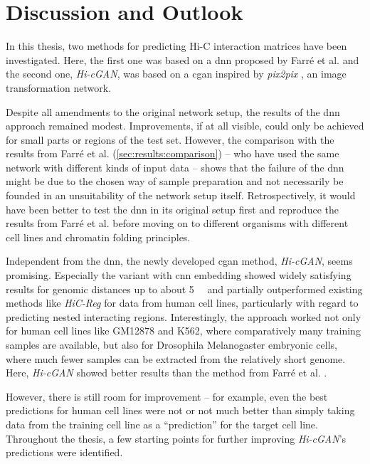 \section{Discussion and Outlook}
In this thesis, two methods for predicting Hi-C interaction matrices have been investigated.
Here, the first one was based on a \acrlong{dnn} proposed by Farr\'e et al. \cite{Farre2018a} and the second one, \emph{Hi-cGAN}, 
was based on a \acrlong{cgan} inspired by \emph{pix2pix} \cite{Isola2017}, an image transformation network.

Despite all amendments to the original network setup,
the results of the \acrlong{dnn} approach remained modest.
Improvements, if at all visible, could only be achieved for small parts or regions of the test set.
However, the comparison with the results from Farr\'e et al. \cite{Farre2018a} (\cref{sec:results:comparison}) -- who have used the same network with different kinds of input data --
shows that the failure of the \acrshort{dnn} might be due to the chosen way of sample preparation 
and not necessarily be founded in an unsuitability of the network setup itself.
Retrospectively, it would have been better to test the \acrshort{dnn} in its original setup first and reproduce the results from Farr\'e et al. \cite{Farre2018a} 
before moving on to different organisms with different cell lines and chromatin folding principles.

Independent from the \acrshort{dnn}, the newly developed \acrlong{cgan} method, \emph{Hi-cGAN}, seems promising.
Especially the variant with \acrshort{cnn} embedding showed widely satisfying results for genomic distances up to about \SI{5}{\mega\bp}
and partially outperformed existing methods like \emph{HiC-Reg} \cite{Zhang2019} for data from human cell lines, 
particularly with regard to predicting nested interacting regions.
Interestingly, the approach worked not only for human cell lines like GM12878 and K562, where comparatively many training samples are available,
but also for Drosophila Melanogaster embryonic cells, where much fewer samples can be extracted from the relatively short genome.
Here, \emph{Hi-cGAN} showed better results than the method from Farr\'e et al. \cite{Farre2018a}.

However, there is still room for improvement -- for example, even the best predictions for human cell lines were not or not much better 
than simply taking data from the training cell line as a ``prediction'' for the target cell line.
Throughout the thesis, a few starting points for further improving \emph{Hi-cGAN}'s predictions were identified.

